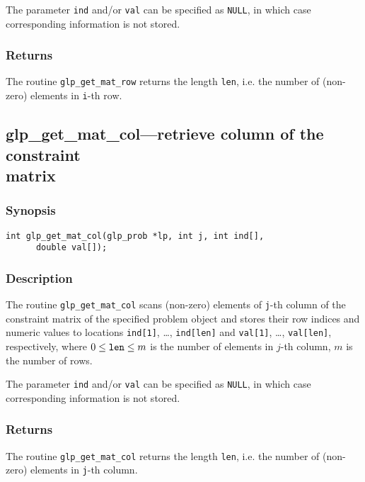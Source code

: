 The parameter \verb|ind| and/or \verb|val| can be specified as
\verb|NULL|, in which case corresponding information is not stored.

\subsubsection*{Returns}

The routine \verb|glp_get_mat_row| returns the length \verb|len|, i.e.
the number of (non-zero) elements in \verb|i|-th row.

\subsection{glp\_get\_mat\_col---retrieve column of the constraint\\
matrix}

\subsubsection*{Synopsis}

\begin{verbatim}
int glp_get_mat_col(glp_prob *lp, int j, int ind[],
      double val[]);
\end{verbatim}

\subsubsection*{Description}

The routine \verb|glp_get_mat_col| scans (non-zero) elements of
\verb|j|-th column of the constraint matrix of the specified problem
object and stores their row indices and numeric values to locations
\verb|ind[1]|, \dots, \verb|ind[len]| and \verb|val[1]|, \dots,
\verb|val[len]|, respectively, where $0\leq{\tt len}\leq m$ is the
number of elements in $j$-th column, $m$ is the number of rows.

The parameter \verb|ind| and/or \verb|val| can be specified as
\verb|NULL|, in which case corresponding information is not stored.

\subsubsection*{Returns}

The routine \verb|glp_get_mat_col| returns the length \verb|len|, i.e.
the number of (non-zero) elements in \verb|j|-th column.


